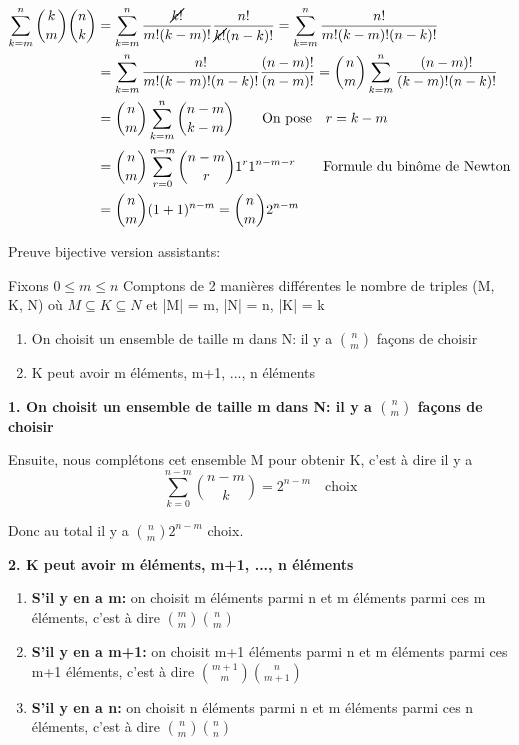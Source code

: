 \begin{align*}
 \sum_{k=m}^n {k \choose m}{n \choose k} &= \sum_{k=m}^n \frac{\cancel{k!}}{m!(k-m)!} \frac{n!}{\cancel{k!}(n-k)!} = \sum_{k=m}^n \frac{n!}{m!(k-m)!(n-k)!} \\
 &= \sum_{k=m}^n \frac{n!}{m!(k-m)!(n-k)!} \frac{(n-m)!}{(n-m)!} = {n \choose m} \sum_{k=m}^n \frac{(n-m)!}{(k-m)!(n-k)!} \\
 &= {n \choose m} \sum_{k=m}^n {n-m \choose k-m} \vspace{1cm} \qquad \text{On pose} \quad r=k-m \\
 &= {n \choose m} \sum_{r=0}^{n-m} {n-m \choose r} 1^{r} 1^{n-m-r} \qquad \text{Formule du binôme de Newton} \\
 &= {n \choose m} (1+1)^{n-m} = {n \choose m} 2^{n-m} 
\end{align*}

Preuve bijective version assistants: 

\begin{minipage}{0.4\textwidth}

\end{minipage}
\begin{minipage}{0.6\textwidth}
Fixons $0 \leq m \leq n$
Comptons de 2 manières différentes le nombre de triples (M, K, N) où $M \subseteq K \subseteq N$ et |M| = m, |N| = n, |K| = k

\begin{enumerate}
\item On choisit un ensemble de taille m dans N: il y a ${n \choose m}$ façons de choisir
\item K peut avoir m éléments, m+1, ..., n éléments 
\end{enumerate}
\end{minipage}

\vspace{1cm}

\textbf{1. On choisit un ensemble de taille m dans N: il y a ${n \choose m}$ façons de choisir}

Ensuite, nous complétons cet ensemble M pour obtenir K, c'est à dire il y a $$\sum_{k=0}^{n-m} {n-m \choose k} = 2^{n-m} \quad \text{choix}$$ 

Donc au total il y a ${n \choose m} 2^{n-m}$ choix.

\textbf{2. K peut avoir m éléments, m+1, ..., n éléments} 

\begin{enumerate}
\item \textbf{S'il y en a m:} on choisit m éléments parmi n et m éléments parmi ces m éléments, c'est à dire ${m \choose m}{n \choose m}$
\item \textbf{S'il y en a m+1:} on choisit m+1 éléments parmi n et m éléments parmi ces m+1 éléments, c'est à dire ${m+1 \choose m}{n \choose m+1}$
\item \textbf{S'il y en a n:} on choisit n éléments parmi n et m éléments parmi ces n éléments, c'est à dire ${n \choose m}{n \choose n}$ 
\end{enumerate}

